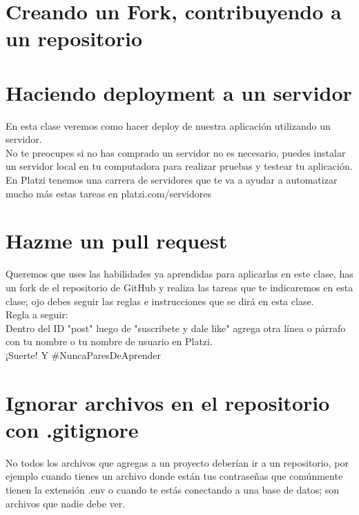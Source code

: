 \documentclass{article}
\begin{document}
\newpage
\section{Creando un Fork, contribuyendo a un repositorio}%

\section{Haciendo deployment a un servidor}%
En esta clase veremos como hacer deploy de nuestra aplicación utilizando un
servidor.\\

No te preocupes si no has comprado un servidor no es necesario, puedes instalar
un servidor local en tu computadora para realizar pruebas y testear tu
aplicación.\\

En Platzi tenemos una carrera de servidores que te va a ayudar a automatizar
mucho más estas tareas en platzi.com/servidores\\

\section{Hazme un pull request}%
Queremos que uses las habilidades ya aprendidas para aplicarlas en este clase,
has un fork de el repositorio de GitHub y realiza las tareas que te indicaremos
en esta clase; ojo debes seguir las reglas e instrucciones que se dirá en esta
clase.\\

Regla a seguir:\\

Dentro del ID "post" luego de "suscribete y dale like" agrega otra línea o
párrafo con tu nombre o tu nombre de usuario en Platzi.\\

¡Suerte! Y \#NuncaParesDeAprender

\section{Ignorar archivos en el repositorio con .gitignore}%
No todos los archivos que agregas a un proyecto deberían ir a un repositorio,
por ejemplo cuando tienes un archivo donde están tus contraseñas que comúnmente
tienen la extensión .env o cuando te estás conectando a una base de datos; son
archivos que nadie debe ver.\\
\end{document}
